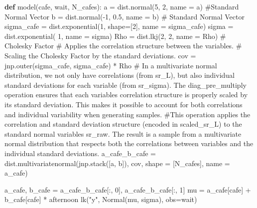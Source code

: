 \documentclass[
  letterpaper,
  DIV=11,
  numbers=noendperiod]{scrreprt}
\newenvironment{Shaded}{\begin{snugshade}}{\end{snugshade}}
\newcommand{\CommentTok}[1]{\textcolor[rgb]{0.37,0.37,0.37}{#1}}
\newcommand{\DecValTok}[1]{\textcolor[rgb]{0.68,0.00,0.00}{#1}}
\newcommand{\FloatTok}[1]{\textcolor[rgb]{0.68,0.00,0.00}{#1}}
\newcommand{\KeywordTok}[1]{\textcolor[rgb]{0.00,0.23,0.31}{\textbf{#1}}}
\newcommand{\NormalTok}[1]{\textcolor[rgb]{0.00,0.23,0.31}{#1}}
\newcommand{\OperatorTok}[1]{\textcolor[rgb]{0.37,0.37,0.37}{#1}}
\newcommand{\StringTok}[1]{\textcolor[rgb]{0.13,0.47,0.30}{#1}}
\begin{document}
\begin{Shaded}
\begin{Highlighting}[]
\KeywordTok{def}\NormalTok{ model(cafe, wait, N\_cafes):}
\NormalTok{    a }\OperatorTok{=}\NormalTok{ dist.normal(}\DecValTok{5}\NormalTok{, }\DecValTok{2}\NormalTok{, name }\OperatorTok{=} \StringTok{\textquotesingle{}a\textquotesingle{}}\NormalTok{) }\CommentTok{\#Standard Normal Vector }
\NormalTok{    b }\OperatorTok{=}\NormalTok{ dist.normal(}\OperatorTok{{-}}\DecValTok{1}\NormalTok{, }\FloatTok{0.5}\NormalTok{, name }\OperatorTok{=} \StringTok{\textquotesingle{}b\textquotesingle{}}\NormalTok{) }\CommentTok{\# Standard Normal Vector }
\NormalTok{    sigma\_cafe }\OperatorTok{=}\NormalTok{ dist.exponential(}\DecValTok{1}\NormalTok{, shape}\OperatorTok{=}\NormalTok{[}\DecValTok{2}\NormalTok{], name }\OperatorTok{=} \StringTok{\textquotesingle{}sigma\_cafe\textquotesingle{}}\NormalTok{)}
\NormalTok{    sigma }\OperatorTok{=}\NormalTok{ dist.exponential( }\DecValTok{1}\NormalTok{, name }\OperatorTok{=} \StringTok{\textquotesingle{}sigma\textquotesingle{}}\NormalTok{)}
\NormalTok{    Rho }\OperatorTok{=}\NormalTok{ dist.lkj(}\DecValTok{2}\NormalTok{, }\DecValTok{2}\NormalTok{, name }\OperatorTok{=} \StringTok{\textquotesingle{}Rho\textquotesingle{}}\NormalTok{) }\CommentTok{\# Cholesky Factor}
    \CommentTok{\# Applies the correlation structure between the variables.}
    \CommentTok{\# Scaling the Cholesky Factor by the standard deviations.}
\NormalTok{    cov }\OperatorTok{=}\NormalTok{ jnp.outer(sigma\_cafe, sigma\_cafe) }\OperatorTok{*}\NormalTok{ Rho }\CommentTok{\# In a multivariate normal distribution, we not only have correlations (from sr\_L), but also individual standard deviations for each variable (from sr\_sigma). The diag\_pre\_multiply operation ensures that each variable\textquotesingle{}s correlation structure is properly scaled by its standard deviation. This makes it possible to account for both correlations and individual variability when generating samples.}
    \CommentTok{\#This operation applies the correlation and standard deviation structure (encoded in scaled\_sr\_L) to the standard normal variables sr\_raw. The result is a sample from a multivariate normal distribution that respects both the correlations between variables and the individual standard deviations.}
\NormalTok{    a\_cafe\_b\_cafe }\OperatorTok{=}\NormalTok{ dist.multivariatenormal(jnp.stack([a, b]), cov, shape }\OperatorTok{=}\NormalTok{ [N\_cafes], name }\OperatorTok{=} \StringTok{\textquotesingle{}a\_cafe\textquotesingle{}}\NormalTok{)    }

\NormalTok{    a\_cafe, b\_cafe }\OperatorTok{=}\NormalTok{ a\_cafe\_b\_cafe[:, }\DecValTok{0}\NormalTok{], a\_cafe\_b\_cafe[:, }\DecValTok{1}\NormalTok{]}
\NormalTok{    mu }\OperatorTok{=}\NormalTok{ a\_cafe[cafe] }\OperatorTok{+}\NormalTok{ b\_cafe[cafe] }\OperatorTok{*}\NormalTok{ afternoon}
\NormalTok{    lk(}\StringTok{"y"}\NormalTok{, Normal(mu, sigma), obs}\OperatorTok{=}\NormalTok{wait)}


\end{Highlighting}
\end{Shaded}
\end{document}
